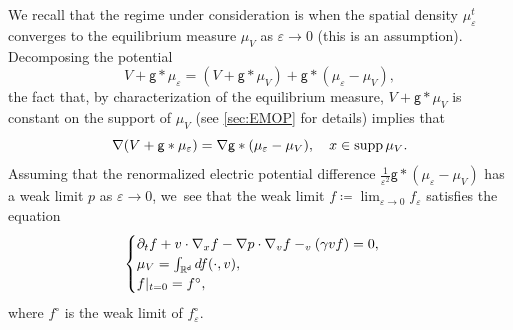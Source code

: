 \documentclass[JEP,XML,SOM,Unicode,published]{cedram}
\theoremstyle{plain}
\theoremstyle{definition}
\DeclarePairedDelimiter{\pa}{\lparen}{\rparen}
\DeclareMathOperator{\supp}{supp}
\let\div\relax
\DeclareMathOperator{\div}{\mathrm{div}}
\newcommand{\R}{{\mathbb{R}}}
\let\ga\gamma
\let\vep\varepsilon
\let\p\partial
\renewcommand{\d}{\mathsf{d}}
\newcommand{\g}{{\mathsf{g}}}
\begin{document}
We recall that the regime under consideration is when the spatial density $\mu_\vep^t$ converges to the equilibrium measure $\mu_V$ as $\vep\to 0$ (this is an assumption). Decomposing the potential
\begin{equation*}
V+\g\ast\mu_\vep = (V+\g\ast\mu_V) + \g\ast(\mu_\vep-\mu_V),
\end{equation*}
the fact that, {by characterization of the equilibrium measure}, $V+\g\ast\mu_V$ is constant on the support of $\mu_V$ (see \cref{sec:EMOP} for details) implies that
\begin{equation*}
\nabla\pa*{V+\g\ast\mu_\vep} = \nabla\g\ast(\mu_\vep-\mu_V), \quad x\in\supp \mu_V.
\end{equation*}
Assuming that the renormalized electric potential difference $\frac{1}{\vep^2}\g\ast(\mu_\vep-\mu_V)$ has a weak limit $p$ as $\vep\to 0$, we~see that the weak limit $f\coloneqq \lim_{\vep\to 0}f_\vep$ satisfies the equation
\begin{equation}\label{eq:KIE}
\begin{cases}
\p_tf+v\cdot\nabla_xf - \nabla p\cdot\nabla_vf -\div_v (\ga v f)=0,\\
\mu_V = \int_{\R^\d}df(\cdot,v),\\
f|_{t=0} = f^\circ,
\end{cases}
\end{equation}
where $f^\circ$ is the weak limit of $f_\vep^\circ$.
\end{document}
